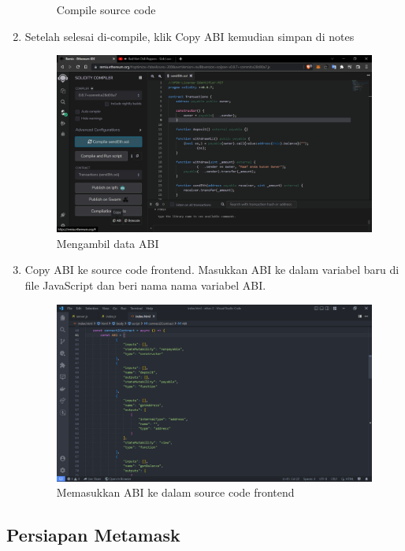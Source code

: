 \begin{enumerate}
\begin{figure}[htp]
		\caption{Compile source code}
		\label{fig:compile}
	\end{figure}
\item{Setelah selesai di-compile, klik Copy ABI kemudian simpan di notes}
	\begin{figure}[htp]
		\centering
		\includegraphics[scale=0.2]{gambar/bab3/deploy/4.png}
		\caption{Mengambil data ABI}
		\label{fig:inputABI}
	\end{figure}
\newpage
\item{Copy ABI ke source code frontend. Masukkan ABI ke dalam variabel baru di file JavaScript dan beri nama nama variabel ABI.}
	\begin{figure}[htp]
		\centering
		\includegraphics[scale=0.2]{gambar/bab3/deploy/7.png}
		\caption{Memasukkan ABI ke dalam source code frontend}
		\label{fig:abitofront}
	\end{figure}
\end{enumerate}

\subsection{Persiapan Metamask}
\label{subsec:solidityandremix}

